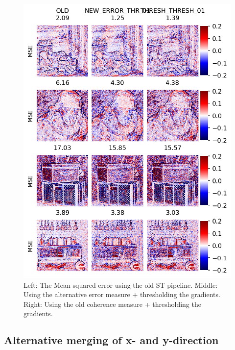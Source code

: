 \documentclass  [
  paper    = a4,
  BCOR     = 10mm,
  twoside,
  fontsize = 12pt,
  fleqn,
  toc      = bibnumbered,
  toc      = listofnumbered,
  numbers  = noendperiod,
  headings = normal,
  listof   = leveldown,
  version  = 3.03
]                                       {scrreprt}
\begin{document}
\begin{figure}
	\centering
	\includegraphics[width=0.7\linewidth]{images/thresh_vs_old_vs_newerror}
	\caption[Comparing alternative coherence to new coherence]{Left: The Mean squared error using the old ST pipeline. Middle: Using the alternative error measure + thresholding the gradients. Right: Using the old coherence measure + thresholding the gradients.}
	\label{fig:threshvsoldvsnewerror}
\end{figure}

\subsection{Alternative merging of x- and y-direction}

\end{document}
